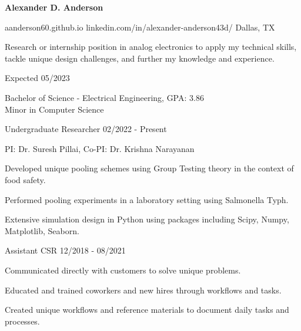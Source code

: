 \documentclass[11pt]{article}
\begin{document}
\centerline{{\Huge \bf Alexander D. Anderson}}

\bigskip

        {aanderson60.github.io}
        {linkedin.com/in/alexander-anderson43d/}
        {Dallas, TX}

Research or internship position in analog electronics to apply my technical skills, tackle unique design challenges, and further my knowledge and experience.


\begin{description}
\squish
{}
            {}
            {Expected 05/2023}

Bachelor of Science - Electrical Engineering, GPA: 3.86\\
Minor in Computer Science 

\end{description}


\begin{description}
\squish

           {Undergraduate Researcher}
           {02/2022 - Present} 

PI: Dr. Suresh Pillai, Co-PI: Dr. Krishna Narayanan

Developed unique pooling schemes using Group Testing theory in the context of food safety.

Performed pooling experiments in a laboratory setting using Salmonella Typh.

Extensive simulation design in Python using packages including Scipy, Numpy, Matplotlib, Seaborn.

           {Assistant CSR}
           {12/2018 - 08/2021}

Communicated directly with customers to solve unique problems.

Educated and trained coworkers and new hires through workflows and tasks.

Created unique workflows and reference materials to document daily tasks and processes.

\end{description}

\end{document}
